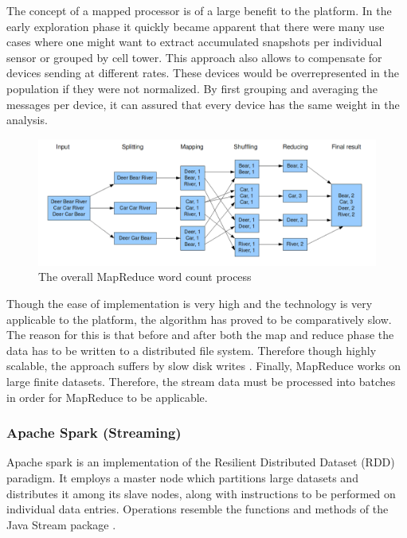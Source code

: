 The concept of a mapped processor is of a large benefit to the platform. In the early exploration phase it quickly became apparent that there were many use cases where one might want to extract accumulated snapshots per individual sensor or grouped by cell tower. This approach also allows to compensate for devices sending at different rates. These devices would be overrepresented in the population if they were not normalized. By first grouping and averaging the messages per device, it can assured that every device has the same weight in the analysis.

\begin{figure}
\centering
\includegraphics[width=\textwidth]{resources/img/mapreduce.png}
\caption{The overall MapReduce word count process \cite{mapreduce_img}}
\label{img:mapreduce}
\end{figure}

Though the ease of implementation is very high and the technology is very applicable to the platform, the algorithm has proved to be comparatively slow. The reason for this is that before and after both the map and reduce phase the data has to be written to a distributed file system. Therefore though highly scalable, the approach suffers by slow disk writes \cite{mapreduce_vs_spark}. Finally, MapReduce works on large finite datasets. Therefore, the stream data must be processed into batches in order for MapReduce to be applicable.

\subsubsection{Apache Spark (Streaming)}
Apache spark \cite{web:spark} is an implementation of the Resilient Distributed Dataset (RDD) paradigm. It employs a master node which partitions large datasets and distributes it among its slave nodes, along with instructions to be performed on individual data entries. Operations resemble the functions and methods of the Java Stream package \cite{java_stream}. 

